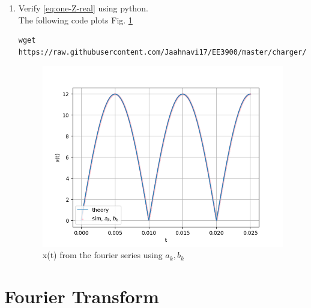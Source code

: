 \documentclass[journal,12pt,twocolumn]{IEEEtran}
\renewcommand\thesection{\arabic{section}}
\begin{document}
\begin{enumerate}[label=\thesection.\arabic*,ref=\thesection.\theenumi]
	
\item Verify 
\eqref{eq:one-Z-real}
using python.
\\\solution The following code plots Fig. \ref{fig:xt-sim-ab}
	\begin{lstlisting}
wget https://raw.githubusercontent.com/Jaahnavi17/EE3900/master/charger/codes/2_6.py
\end{lstlisting}
	\begin{figure}[h!]
	    \centering
	    \includegraphics[width=\columnwidth]{figures/xt-sim-ab.png}
	    \caption{x(t) from the fourier series using $a_k, b_k$}
	    \label{fig:xt-sim-ab}
	\end{figure}
\end{enumerate}
\section{Fourier Transform}

 
\end{document}
